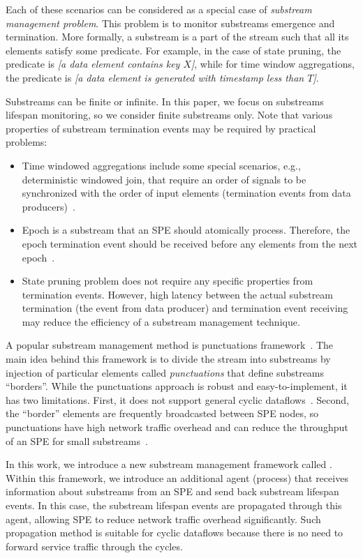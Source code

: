 Each of these scenarios can be considered as a special case of {\em substream management problem}. This problem is to monitor substreams emergence and termination. More formally, a substream is a part of the stream such that all its elements satisfy some predicate. For example, in the case of state pruning, the predicate is {\em [a data element contains key $X$]}, while for time window aggregations, the predicate is {\em [a data element is generated with timestamp less than $T$]}. 

Substreams can be finite or infinite. In this paper, we focus on substreams lifespan monitoring, so we consider finite substreams only. Note that various properties of substream termination events may be required by practical problems:
\begin{itemize}
    \item Time windowed aggregations include some special scenarios, e.g., deterministic windowed join, that require an order of signals to be synchronized with the order of input elements (termination events from data producers)~\cite{najdataei2019stretch, gulisano2016scalejoin}.
    \item Epoch is a substream that an SPE should atomically process. Therefore, the epoch termination event should be received before any elements from the next epoch~\cite{2015arXiv150608603C}. 
    \item State pruning problem does not require any specific properties from termination events. However, high latency between the actual substream termination (the event from data producer) and termination event receiving may reduce the efficiency of a substream management technique.
\end{itemize}

A popular substream management method is punctuations framework~\cite{tucker2003exploiting}. The main idea behind this framework is to divide the stream into substreams by injection of particular elements called {\em punctuations} that define substreams ``borders''. While the punctuations approach is robust and easy-to-implement, it has two limitations. First, it does not support general cyclic dataflows~\cite{carbone2018scalable}. Second, the ``border'' elements are frequently broadcasted between SPE nodes, so punctuations have high network traffic overhead and can reduce the throughput of an SPE for small substreams~\cite{Li:2008:OPN:1453856.1453890}. 

In this work, we introduce a new substream management framework called \tracker. Within this framework, we introduce an additional agent (process) that receives information about substreams from an SPE and send back substream lifespan events. In this case, the substream lifespan events are propagated through this agent, allowing SPE to reduce network traffic overhead significantly. Such propagation method is suitable for cyclic dataflows because there is no need to forward service traffic through the cycles.

